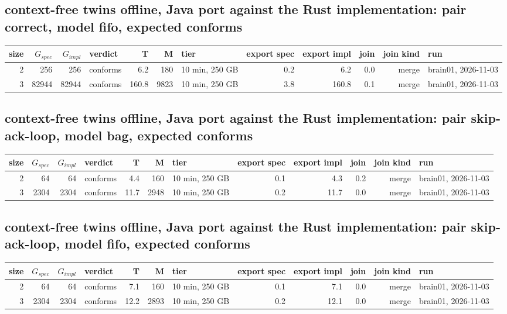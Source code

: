 \documentclass[10pt]{article}
\begin{document}
\subsection*{context-free twins offline, Java port against the Rust implementation: pair \textsf{correct}, model fifo, expected conforms}
\begin{longtable}{@{}rrrlrrlrrrrl@{}}
\toprule
size & $G_{\mathit{spec}}$ & $G_{\mathit{impl}}$ & verdict & T & M & tier & export spec & export impl & join & join kind & run \\
\midrule
\endhead
\color{blue} 2 & 256 & 256 & conforms & 6.2 & 180 & 10 min, 250 GB & 0.2 & 6.2 & 0.0 & merge & brain01, 2026-11-03 \\
\color{blue} 3 & 82944 & 82944 & conforms & 160.8 & 9823 & 10 min, 250 GB & 3.8 & 160.8 & 0.1 & merge & brain01, 2026-11-03 \\
\bottomrule
\end{longtable}
\subsection*{context-free twins offline, Java port against the Rust implementation: pair \textsf{skip-ack-loop}, model bag, expected conforms}
\begin{longtable}{@{}rrrlrrlrrrrl@{}}
\toprule
size & $G_{\mathit{spec}}$ & $G_{\mathit{impl}}$ & verdict & T & M & tier & export spec & export impl & join & join kind & run \\
\midrule
\endhead
\color{blue} 2 & 64 & 64 & conforms & 4.4 & 160 & 10 min, 250 GB & 0.1 & 4.3 & 0.2 & merge & brain01, 2026-11-03 \\
\color{blue} 3 & 2304 & 2304 & conforms & 11.7 & 2948 & 10 min, 250 GB & 0.2 & 11.7 & 0.0 & merge & brain01, 2026-11-03 \\
\bottomrule
\end{longtable}
\subsection*{context-free twins offline, Java port against the Rust implementation: pair \textsf{skip-ack-loop}, model fifo, expected conforms}
\begin{longtable}{@{}rrrlrrlrrrrl@{}}
\toprule
size & $G_{\mathit{spec}}$ & $G_{\mathit{impl}}$ & verdict & T & M & tier & export spec & export impl & join & join kind & run \\
\midrule
\endhead
\color{blue} 2 & 64 & 64 & conforms & 7.1 & 160 & 10 min, 250 GB & 0.1 & 7.1 & 0.0 & merge & brain01, 2026-11-03 \\
\color{blue} 3 & 2304 & 2304 & conforms & 12.2 & 2893 & 10 min, 250 GB & 0.2 & 12.1 & 0.0 & merge & brain01, 2026-11-03 \\
\bottomrule
\end{longtable}
\end{document}
